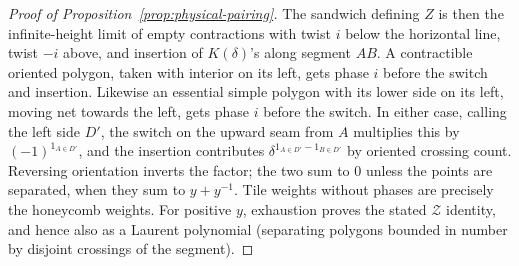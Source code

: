 \begin{proof}[Proof of Proposition~\ref{prop:physical-pairing}]
The sandwich defining \(Z\) is then the infinite-height limit of empty contractions with twist \(i\) below the horizontal line, twist \(-i\) above, and insertion of \(K(\delta)\)'s along segment \(AB\). A contractible oriented polygon, taken with interior on its left, gets phase \(i\) before the switch and insertion. Likewise an essential simple polygon with its lower side on its left, moving net towards the left, gets phase \(i\) before the switch. In either case, calling the left side \(D'\), the switch on the upward seam from \(A\) multiplies this by \((-1)^{1_{A\in D'}}\), and the insertion contributes \(\delta^{1_{A\in D'}-1_{B\in D'}}\) by oriented crossing count. Reversing orientation inverts the factor; the two sum to 0 unless the points are separated, when they sum to \(y+y^{-1}\). Tile weights without phases are precisely the honeycomb weights. For positive \(y\), exhaustion proves the stated \(\mathcal Z\) identity, and hence also as a Laurent polynomial (separating polygons bounded in number by disjoint crossings of the segment).
\end{proof}
